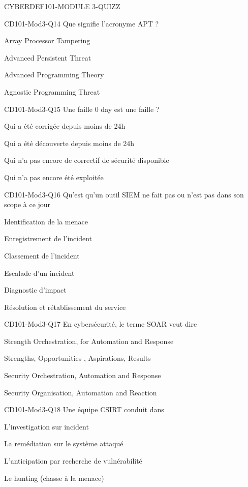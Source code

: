 \documentclass[12pt]{article}
\begin{document}
\begin{quiz}{CYBERDEF101-MODULE 3-QUIZZ}
\begin{multi}[multiple=true]{CD101-Mod3-Q14}
Que signifie l'acronyme APT ?
\item Array Processor Tampering
\item* Advanced Persistent Threat
\item Advanced Programming Theory
\item Agnostic Programming Threat
\end{multi}

\begin{multi}[multiple=true]{CD101-Mod3-Q15}
Une faille 0 day est une faille ?
\item Qui a \'et\'e corrig\'ee depuis moins de 24h
\item Qui a \'et\'e d\'ecouverte depuis moins de 24h
\item* Qui n'a pas encore de correctif de s\'ecurit\'e disponible
\item Qui n'a pas encore \'et\'e exploit\'ee
\end{multi}

\begin{multi}[multiple=true]{CD101-Mod3-Q16}
Qu'est qu'un outil SIEM ne fait pas ou n'est pas dans son scope  \`a ce jour
\item Identification de la menace
\item Enregistrement de l'incident
\item Classement de l'incident
\item Escalade d'un incident
\item* Diagnostic d'impact
\item* R\'esolution et r\'etablissement du service
\end{multi}

\begin{multi}[multiple=true]{CD101-Mod3-Q17}
En cybers\'ecurit\'e, le terme  SOAR veut dire
\item Strength Orchestration, for Automation and Response 
\item Strengths, Opportunities , Aspirations, Results
\item*  Security Orchestration, Automation and Response
\item Security Organisation, Automation and Reaction
\end{multi}

\begin{multi}[multiple=true]{CD101-Mod3-Q18}
Une \'equipe CSIRT conduit dans 
\item* L'investigation sur incident
\item La rem\'ediation sur le syst\`eme attaqu\'e
\item L'anticipation par recherche de vuln\'erabilit\'e
\item* Le hunting (chasse \`a la menace)
\end{multi}


\end{quiz}
\end{document}
